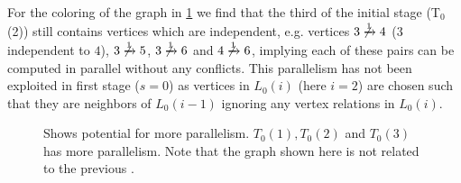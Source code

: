 For the \DONE coloring of the graph in \cref{fig:rec_d1_s1} we find that the third \levelGroup of the initial stage (T$_0$(2)) still contains vertices which are \DONE independent, e.g. vertices $3 \not\xrightarrow{1} 4$ ($3$  \DONE independent to $4$), $3 \not\xrightarrow{1} 5$, $3 \not\xrightarrow{1} 6$ and $4 \not\xrightarrow{1} 6$, implying each of these pairs can be computed in parallel without any \DONE conflicts. This parallelism has not been exploited in first stage ($s=0$)  as vertices in $L_0(i)$ (here $i=2$) are chosen such that they are \DONE neighbors of \level $L_0(i-1)$ ignoring any vertex relations in $L_0(i)$. 
     \begin{figure}[thbp]
     	\centering
     	\hspace{1.5em}
     	\hspace{1.5em}
        \caption{Shows potential for more parallelism. $T_0(1),T_0(2)$ and $T_0(3)$ has more parallelism. Note that the graph shown here is not related to the previous \stex.}
     	\label{fig:rec_d1_s1}
     \end{figure}

